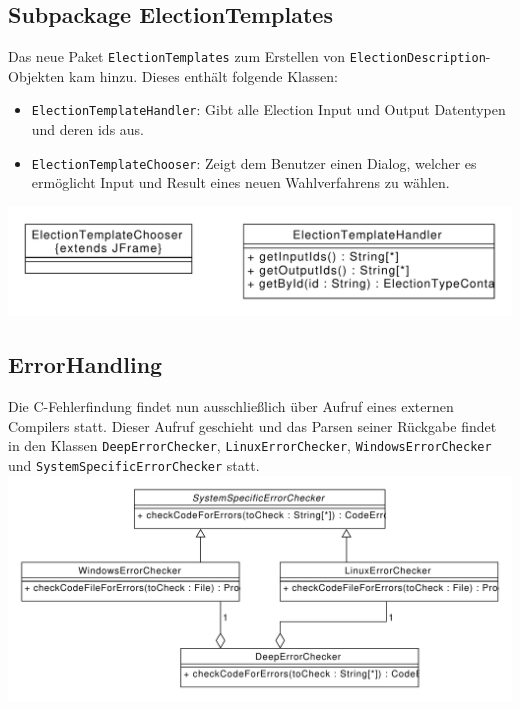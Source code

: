 \documentclass[a4paper]{scrreprt}
\begin{document}
\subsection{Subpackage ElectionTemplates}
Das neue Paket \verb!ElectionTemplates! zum Erstellen von \verb!ElectionDescription!-Objekten kam hinzu. Dieses enthält folgende Klassen:
\begin{itemize}
\item \verb!ElectionTemplateHandler!: Gibt alle Election Input und Output Datentypen und deren ids aus.
\item \verb!ElectionTemplateChooser!: Zeigt dem Benutzer einen Dialog, welcher es ermöglicht Input und Result eines neuen Wahlverfahrens zu wählen.
\end{itemize}
\includegraphics[scale=0.5]{ElectionTemplates.pdf}\\

\subsection{ErrorHandling}
Die C-Fehlerfindung findet nun ausschließlich über Aufruf eines externen Compilers statt. Dieser Aufruf geschieht und das Parsen seiner Rückgabe findet in den Klassen \verb!DeepErrorChecker!, \verb!LinuxErrorChecker!, \verb!WindowsErrorChecker! und \verb!SystemSpecificErrorChecker! statt.\\
\includegraphics[scale=0.5]{CErrorChecking.pdf}
\end{document}
